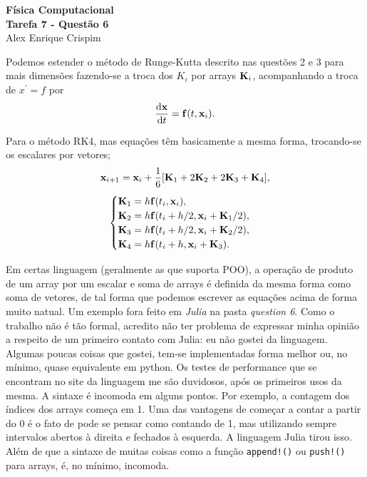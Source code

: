 


  \begin{center}
    \LARGE \textbf{Física Computacional} \\
    \Large \textbf{Tarefa 7 - Questão 6} \\
    \large Alex Enrique Crispim
  \end{center}

  Podemos estender o método de Runge-Kutta descrito nas questões 2 e 3 para mais dimensões fazendo-se a troca dos $K_i$ por arrays $\vb{K}_i$, acompanhando a troca de $x^\prime = f$ por
  \begin{equation*}
    \dv{\vb{x}}{t} = \vb{f}(t, \vb{x}_i).
  \end{equation*}

  Para o método RK4, mas equações têm basicamente a mesma forma, trocando-se os escalares por vetores;
  \begin{equation}
    \vb{x}_{i+1} = \vb{x}_i + \frac{1}{6} \qty[\vb{K}_1 + 2 \vb{K}_2 + 2\vb{K}_3 + \vb{K}_4],
  \end{equation}
  \begin{equation*}
    \begin{cases}
      \vb{K}_1 = h \vb{f}(t_i, \vb{x}_i), \\
      \vb{K}_2 = h \vb{f}(t_i + h/2, \vb{x}_i + \vb{K}_1 / 2), \\
      \vb{K}_3 = h \vb{f}(t_i + h/2, \vb{x}_i + \vb{K}_2 / 2), \\
      \vb{K}_4 = h \vb{f}(t_i + h, \vb{x}_i + \vb{K}_3).
    \end{cases}
  \end{equation*}

  Em certas linguagem (geralmente as que suporta POO), a operação de produto de um array por um escalar e soma de arrays é definida da mesma forma como soma de vetores, de tal forma que podemos escrever as equações acima de forma muito natual. Um exemplo fora feito em \textit{Julia} na pasta \textit{question 6}. Como o trabalho não é tão formal, acredito não ter problema de expressar minha opinião a respeito de um primeiro contato com Julia: eu não gostei da linguagem. Algumas poucas coisas que gostei, tem-se implementadas forma melhor ou, no mínimo, quase equivalente em python. Os testes de performance que se encontram no site da linguagem me são duvidosos, após os primeiros usos da mesma. A sintaxe é incomoda em alguns pontos. Por exemplo, a contagem dos índices dos arrays começa em 1. Uma das vantagens de começar a contar a partir do 0 é o fato de pode se pensar como contando de 1, mas utilizando sempre intervalos abertos à direita e fechados à esquerda. A linguagem Julia tirou isso. Além de que a sintaxe de muitas coisas como a função \texttt{append!()} ou \texttt{push!()} para arrays, é, no mínimo, incomoda. 


